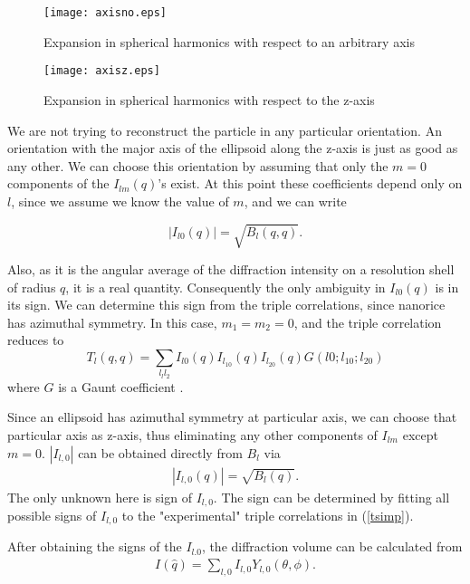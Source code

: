 \begin{figure}[h]
\centering
\texttt{[image: axisno.eps]}
\caption{Expansion in spherical harmonics with respect to an arbitrary axis}
\label{axisno}
\end{figure}

\begin{figure}[h]
\centering
\texttt{[image: axisz.eps]}
\caption{Expansion in spherical harmonics with respect to the z-axis}
\label{axisz}
\end{figure}

We are not trying to reconstruct the particle in any particular orientation. An orientation with the major axis of the ellipsoid along the z-axis is just as good as any other. We can choose this orientation by assuming that only the $m=0$ components of the $I_{lm}(q)$'s exist. At this point these coefficients depend only on $l$, since we assume we know the value of $m$, and we can write

\begin{equation}
|I_{l0}(q)|=\sqrt{B_l(q,q)}. 
\end{equation}

Also, as it is the angular average of the diffraction intensity on a resolution shell of radius $q$, it is a real quantity. Consequently the only ambiguity in $I_{l0}(q)$ is in its sign. We can determine this sign from the triple correlations, since nanorice has azimuthal symmetry. In this case, $m_1=m_2=0$, and the triple correlation reduces to
\begin{equation}
T_l(q,q)=\sum_{l_ll_2} I_{l0}(q) I_{l_10}(q) I_{l_20}(q) G(l0; l_10; l_20)
\label{tsimp}
\end{equation}
where $G$ is a Gaunt coefficient \cite{pendry1974}.

Since an ellipsoid has azimuthal symmetry at particular axis, we can choose that particular axis as z-axis, thus eliminating any other components of $I_{lm}$ except $m=0$. $|I_{l,0}|$ can be obtained directly from $B_{l}$ via
\begin{eqnarray}
|I_{l,0}(q)|=\sqrt{B_{l}(q)}.
\label{Il0B}
\end{eqnarray}
The only unknown here is sign of $I_{l,0}$. The sign can be determined by fitting all possible signs of $I_{l,0}$ to the "experimental" triple correlations in (\ref{tsimp}).

After obtaining the signs of the $I_{l.0}$, the diffraction volume can be calculated from
\begin{eqnarray}
I(\hat{q})=\sum_{l,0} I_{l,0} Y_{l,0}(\theta,\phi). 
\end{eqnarray}

